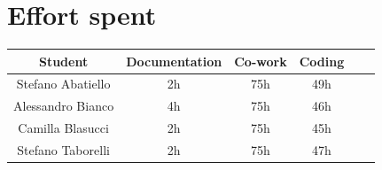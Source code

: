 \documentclass[table, 12pt]{article}
\begin{document}
\section{Effort spent}
\begin{tabular}{ | c || c | c | c | c| c|}
    \hline
    Student           & Documentation   & Co-work     & Coding  \\ \hline
    Stefano Abatiello      & 2h          	   & 75h              & 49h            \\ \hline
    Alessandro Bianco    & 4h        	   & 75h              & 46h             \\ \hline
    Camilla Blasucci       & 2h          	   & 75h              & 45h          \\ \hline
    Stefano Taborelli       & 2h          	   & 75h              & 47h       \\ 
    \hline
\end{tabular}
\end{document}
